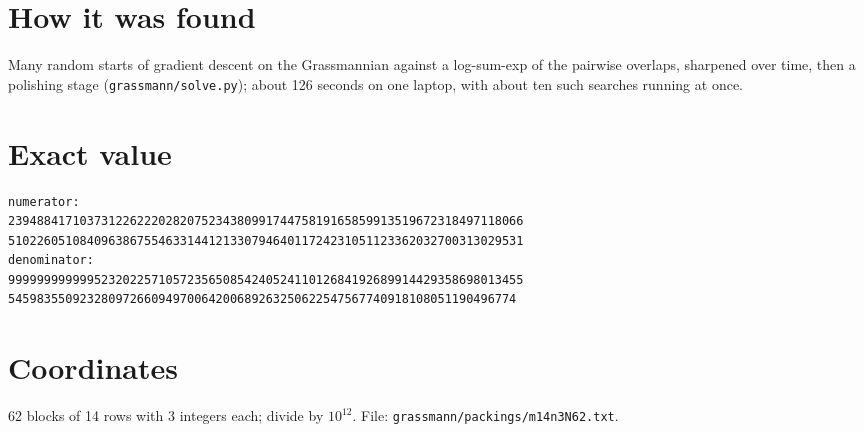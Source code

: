 \documentclass[11pt,a4paper]{article}
\begin{document}
\section{How it was found}
Many random starts of gradient descent on the Grassmannian against a log-sum-exp of the pairwise overlaps, sharpened over time, then a polishing stage (\texttt{grassmann/solve.py}); about 126 seconds on one laptop, with about ten such searches running at once.


\appendix
\section{Exact value}
{\small
\begin{verbatim}
numerator:
239488417103731226222028207523438099174475819165859913519672318497118066
510226051084096386755463314412133079464011724231051123362032700313029531
denominator:
999999999999523202257105723565085424052411012684192689914429358698013455
54598355092328097266094970064200689263250622547567740918108051190496774
\end{verbatim}}

\section{Coordinates}
62 blocks of 14 rows with 3 integers each; divide by $10^{12}$. File: \texttt{grassmann/packings/m14n3N62.txt}.
{\tiny
\begin{multicols}{3}
\end{multicols}}
\end{document}
